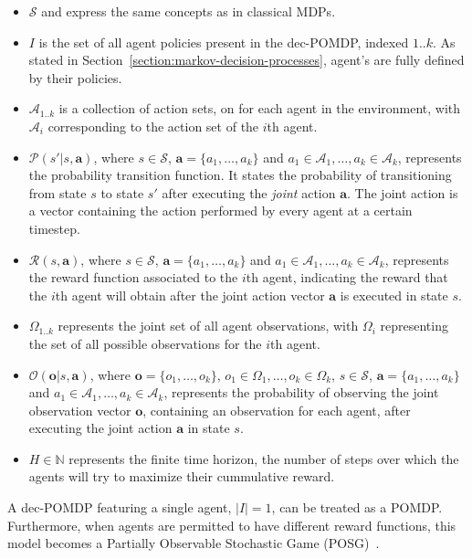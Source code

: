 \documentclass{../main.tex}{subfile}
\begin{document}
    \begin{itemize}
        \item $\mathcal{S}$ and express the same concepts as in classical MDPs.
        \item $I$ is the set of all agent policies present in the dec-POMDP, indexed $1..k$. As stated in Section~\ref{section:markov-decision-processes}, agent's are fully defined by their policies.
        \item $\mathcal{A}_{1..k}$ is a collection of action sets, on for each agent in the environment, with $\mathcal{A}_i$ corresponding to the action set of the $i$th agent.
        \item $\mathcal{P}(s' | s, \mathbf{a})$, where $s \in \mathcal{S}$, $\mathbf{a} = \{a_1,\ldots,a_k\}$ and $a_1 \in \mathcal{A}_1, \ldots, a_k \in \mathcal{A}_k$, represents the probability transition function. It states the probability of transitioning from state $s$ to state $s'$ after executing the \textit{joint} action $\mathbf{a}$. The joint action is a vector containing the action performed by every agent at a certain timestep.
        \item $\mathcal{R}(s, \mathbf{a})$, where $s \in \mathcal{S}$, $\mathbf{a} = \{a_1,\ldots,a_k\}$ and $a_1 \in \mathcal{A}_1, \ldots, a_k \in \mathcal{A}_k$, represents the reward function associated to the $i$th agent, indicating the reward that the $i$th agent will obtain after the joint action vector $\mathbf{a}$ is executed in state $s$.
        \item $\Omega_{1..k}$ represents the joint set of all agent observations, with $\Omega_i$ representing the set of all possible observations for the $i$th agent.
        \item $\mathcal{O}(\mathbf{o} | s, \mathbf{a})$, where $\mathbf{o} = \{o_1,\ldots,o_k\}$, $o_1 \in \Omega_1, \ldots, o_k \in \Omega_k$, $s \in \mathcal{S}$, $\mathbf{a} = \{a_1,\ldots,a_k\}$ and $a_1 \in \mathcal{A}_1, \ldots, a_k \in \mathcal{A}_k$, represents the probability of observing the joint observation vector $\mathbf{o}$, containing an observation for each agent, after executing the joint action $\mathbf{a}$ in state $s$.
        \item $H \in \mathbb{N}$ represents the finite time horizon, the number of steps over which the agents will try to maximize their cummulative reward.
    \end{itemize}

    A dec-POMDP featuring a single agent, $|I| = 1$, can be treated as a POMDP\@. Furthermore, when agents are permitted to have different reward functions, this model becomes a Partially Observable Stochastic Game (POSG)~\citep{Hansen2004}.
\end{document}
